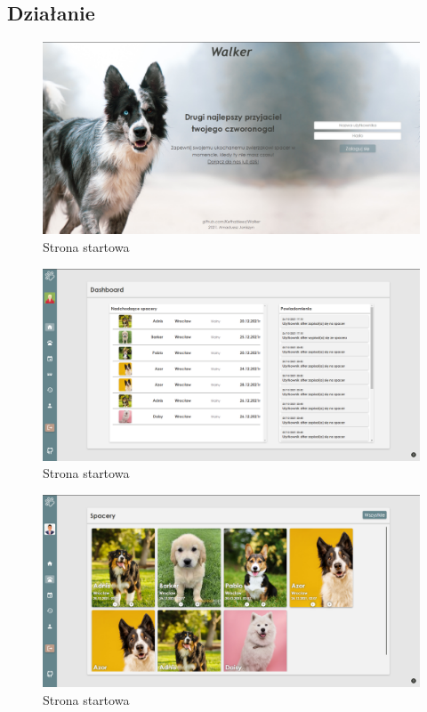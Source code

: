 \subsection{Działanie}
\begin{figure}[H]
  \centering
  \includegraphics[width=1\linewidth]{rysunki/walker-1.PNG}
  \caption{Strona startowa}
  \label{fig:walker-landing-page}
\end{figure}
\begin{figure}[H]
  \centering
  \includegraphics[width=1\linewidth]{rysunki/walker-2.PNG}
  \caption{Strona startowa}
  \label{fig:walker-landing-page}
\end{figure}
\begin{figure}[H]
  \centering
  \includegraphics[width=1\linewidth]{rysunki/walker-3.PNG}
  \caption{Strona startowa}
  \label{fig:walker-landing-page}
\end{figure}
